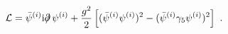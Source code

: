 \begin{equation}
{\cal L}= \bar{\psi}^{(i)} {\rm i} \partial \!\!\!/ \, \psi^{(i)} +
\frac{g^2}{2}\left[ (\bar{\psi}^{(i)}\psi^{(i)})^2- (\bar{\psi}^{(i)} \gamma_5 \psi^{(i)})^2 \right] \ .
\label{eq4p}
\end{equation}

